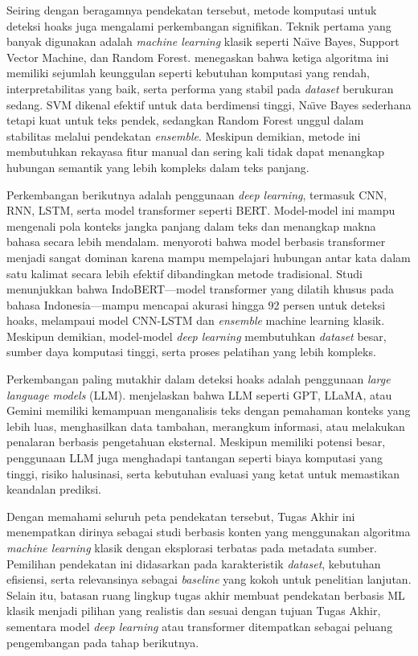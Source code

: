 Seiring dengan beragamnya pendekatan tersebut, metode komputasi untuk deteksi hoaks juga mengalami perkembangan signifikan. Teknik pertama yang banyak digunakan adalah \textit{machine learning} klasik seperti Na\"{\i}ve Bayes, Support Vector Machine, dan Random Forest. \textcite{Alghamdi2022info13120576} menegaskan bahwa ketiga algoritma ini memiliki sejumlah keunggulan seperti kebutuhan komputasi yang rendah, interpretabilitas yang baik, serta performa yang stabil pada \textit{dataset} berukuran sedang. SVM dikenal efektif untuk data berdimensi tinggi, Na\"{\i}ve Bayes sederhana tetapi kuat untuk teks pendek, sedangkan Random Forest unggul dalam stabilitas melalui pendekatan \textit{ensemble}. Meskipun demikian, metode ini membutuhkan rekayasa fitur manual dan sering kali tidak dapat menangkap hubungan semantik yang lebih kompleks dalam teks panjang.

Perkembangan berikutnya adalah penggunaan \textit{deep learning}, termasuk CNN, RNN, LSTM, serta model transformer seperti BERT. Model-model ini mampu mengenali pola konteks jangka panjang dalam teks dan menangkap makna bahasa secara lebih mendalam. \textcite{emilremus2025} menyoroti bahwa model berbasis transformer menjadi sangat dominan karena mampu mempelajari hubungan antar kata dalam satu kalimat secara lebih efektif dibandingkan metode tradisional. Studi \textcite{pekandi2025evaluating} menunjukkan bahwa IndoBERT—model transformer yang dilatih khusus pada bahasa Indonesia—mampu mencapai akurasi hingga 92 persen untuk deteksi hoaks, melampaui model CNN-LSTM dan \textit{ensemble} machine learning klasik. Meskipun demikian, model-model \textit{deep learning} membutuhkan \textit{dataset} besar, sumber daya komputasi tinggi, serta proses pelatihan yang lebih kompleks.

Perkembangan paling mutakhir dalam deteksi hoaks adalah penggunaan \textit{large language models} (LLM). \textcite{emilremus2025} menjelaskan bahwa LLM seperti GPT, LLaMA, atau Gemini memiliki kemampuan menganalisis teks dengan pemahaman konteks yang lebih luas, menghasilkan data tambahan, merangkum informasi, atau melakukan penalaran berbasis pengetahuan eksternal. Meskipun memiliki potensi besar, penggunaan LLM juga menghadapi tantangan seperti biaya komputasi yang tinggi, risiko halusinasi, serta kebutuhan evaluasi yang ketat untuk memastikan keandalan prediksi.

Dengan memahami seluruh peta pendekatan tersebut, Tugas Akhir ini menempatkan dirinya sebagai studi berbasis konten yang menggunakan algoritma \textit{machine learning} klasik dengan eksplorasi terbatas pada metadata sumber. Pemilihan pendekatan ini didasarkan pada karakteristik \textit{dataset}, kebutuhan efisiensi, serta relevansinya sebagai \textit{baseline} yang kokoh untuk penelitian lanjutan. Selain itu, batasan ruang lingkup tugas akhir membuat pendekatan berbasis ML klasik menjadi pilihan yang realistis dan sesuai dengan tujuan Tugas Akhir, sementara model \textit{deep learning} atau transformer ditempatkan sebagai peluang pengembangan pada tahap berikutnya.


